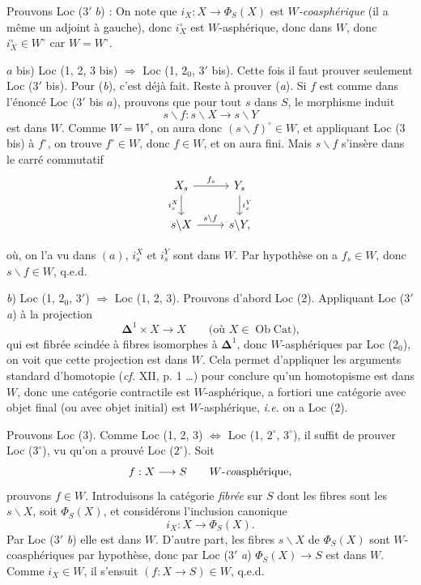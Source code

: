 \documentclass[11pt]{article}
\newcommand{\printedpage}[1]{\marginpar{\footnotesize p.~#1}}
\newcommand{\msp}[1]{\marginpar{\footnotesize [#1]}}
\begin{document}
Prouvons Loc ($3'$ $b$) : On note que $i_X : X \longrightarrow \Phi_S(X)$ est $W$\textit{-coasphérique} (il a même un adjoint à gauche), donc $i_X^\circ$ est $W$-asphérique, donc dans $W$, donc $i_X^\circ \in W^\circ$ car $W = W^\circ$. %

$a$ bis) Loc (1, 2, 3 bis) $\Longrightarrow$ Loc (1, $2_0$, $3'$ bis). Cette fois il faut prouver seulement Loc ($3'$ bis). Pour (\textit{b}), c’est déjà fait. Reste à prouver (\textit{a}). Si $f$ est comme dans l’énoncé Loc ($3'$ bis $a$), prouvons que pour tout $s$ dans $S$, le morphisme induit
\[
s\backslash f : s\backslash X \longrightarrow s\backslash Y
\]
est dans $W$. Comme $W = W^\circ$, on aura donc $(s\backslash f)^\circ \in W$, et appliquant Loc (3 bis) à $f^\circ$, on trouve $f^\circ \in W$, donc $f \in W$, et on aura fini. Mais $s\backslash f$ s’insère dans le carré commutatif
\msp{page 6}
\[
\begin{tikzcd}
X_s \arrow[r, "f_s"] \arrow[d, "i_s^X"'] & Y_s \arrow[d, "i_s^Y"] \\
s\backslash X \arrow[r, "s\backslash f"] & s\backslash Y,
\end{tikzcd}
\]

\setcounter{footnote}{2}

\printedpage{4}
où, on l'a vu dans $(a)$, $i_s^X$ et $i_s^Y$ sont dans $W$. Par hypothèse on a $f_s \in W$, donc $s\backslash f \in W$, q.e.d.

\textit{b}) Loc (1, $2_0$, $3'$) $\Longrightarrow$ Loc (1, 2, 3). Prouvons d'abord Loc (2). Appliquant Loc ($3'$ \textit{a}) à la projection
\[
\boldsymbol{\Delta}^1 \times X \longrightarrow X \qquad \text{(où $X \in \operatorname{Ob}\mathrm{Cat}$),}
\]
qui est fibrée scindée à fibres isomorphes à $\boldsymbol{\Delta}^1$, donc $W$-asphériques par Loc ($2_0$), on voit que cette projection est dans $W$. Cela permet d'appliquer les arguments standard d'homotopie (\textit{cf.} XII, p. 1 \ldots) pour conclure qu'un homotopisme est dans $W$, donc une catégorie contractile est $W$-asphérique, a fortiori une catégorie avec objet final (ou avec objet initial) est $W$-asphérique, \textit{i.e.} on a Loc (2).

Prouvons Loc (3). Comme Loc (1, 2, 3) $\Longleftrightarrow$ Loc (1, $2^\circ$, $3^\circ$), il suffit de prouver Loc ($3^\circ$), vu qu'on a prouvé Loc ($2^\circ$). Soit
\[
f : X \longrightarrow S \qquad \text{$W$-\textit{co}asphérique,}
\]
prouvons $f \in W$. Introduisons la catégorie \textit{fibrée} sur $S$ dont les fibres sont les $s\backslash X$, soit $\Phi_S(X)$, et considérons l'inclusion canonique
\[
i_X : X \longrightarrow \Phi_S(X).
\]
\msp{page 7}Par Loc ($3'$ \textit{b}) elle est dans $W$. D'autre part, les fibres $s\backslash X$ de $\Phi_S(X)$ sont $W$-coasphériques par hypothèse, donc par Loc ($3'$ \textit{a}) $\Phi_S(X) \longrightarrow S$ est dans $W$. Comme $i_X \in W$, il s'ensuit $(f : X \longrightarrow S) \in W$, q.e.d.
\end{document}
